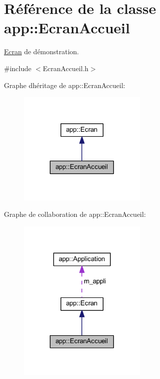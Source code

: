\hypertarget{classapp_1_1_ecran_accueil}{}\section{Référence de la classe app\+:\+:Ecran\+Accueil}
\label{classapp_1_1_ecran_accueil}


\hyperlink{classapp_1_1_ecran}{Ecran} de démonstration.  




{\ttfamily \#include $<$Ecran\+Accueil.\+h$>$}



Graphe d\textquotesingle{}héritage de app\+:\+:Ecran\+Accueil\+:\nopagebreak
\begin{figure}[H]
\begin{center}
\leavevmode
\includegraphics[width=176pt]{classapp_1_1_ecran_accueil__inherit__graph}
\end{center}
\end{figure}


Graphe de collaboration de app\+:\+:Ecran\+Accueil\+:\nopagebreak
\begin{figure}[H]
\begin{center}
\leavevmode
\includegraphics[width=176pt]{classapp_1_1_ecran_accueil__coll__graph}
\end{center}
\end{figure}
